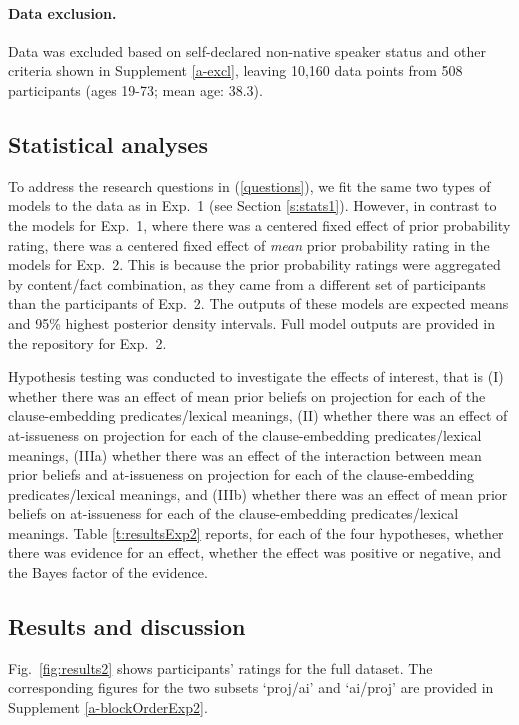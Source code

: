\documentclass[11pt,fleqn]{article}
\newcommand{\6}{\mbox{$[\hspace*{-.6mm}[$}}
\newcommand{\9}{\mbox{$]\hspace*{-.6mm}]$}}
\begin{document}
\paragraph{Data exclusion.} Data was excluded based on self-declared non-native speaker status and other criteria shown in Supplement \ref{a-excl}, leaving 10,160 data points from 508 participants (ages 19-73; mean age: 38.3).

\subsection{Statistical analyses}

To address the research questions in (\ref{questions}), we fit the same two types of models to the data as in Exp.~1 (see Section \ref{s:stats1}). However, in contrast to the models for Exp.~1, where there was a centered fixed effect of prior probability rating, there was a centered fixed effect of {\em mean} prior probability rating in the models for Exp.~2. This is because the prior probability ratings were aggregated by content/fact combination, as they came from a different set of participants than the participants of Exp.~2. The outputs of these models are expected means and 95\% highest posterior density intervals. Full model outputs are provided in the repository for Exp.~2.

Hypothesis testing was conducted to investigate the effects of interest, that is (I) whether there was an effect of mean prior beliefs on projection for each of the clause-embedding predicates/lexical meanings, (II) whether there was an effect of at-issueness on projection for each of the clause-embedding predicates/lexical meanings, (IIIa) whether there was an effect of the interaction between mean prior beliefs and at-issueness on projection for each of the clause-embedding predicates/lexical meanings, and (IIIb) whether there was an effect of mean prior beliefs on at-issueness for each of the clause-embedding predicates/lexical meanings. Table \ref{t:resultsExp2} reports, for each of the four hypotheses, whether there was evidence for an effect, whether the effect was positive or negative, and the Bayes factor of the evidence. 

\subsection{Results and discussion}

Fig.~\ref{fig:results2} shows participants' ratings for the full dataset. The corresponding figures for the two subsets `proj/ai' and `ai/proj' are provided in Supplement \ref{a-blockOrderExp2}.
\end{document}

